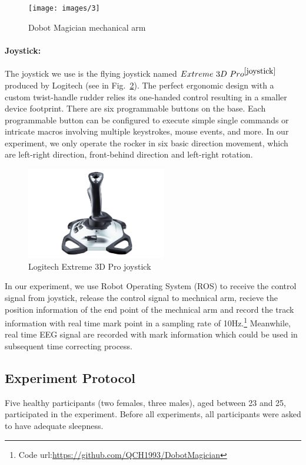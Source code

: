 \documentclass[runningheads,a4paper]{llncs}
\begin{document}
\begin{figure}
    \centering
    \texttt{[image: images/3]}
    \caption{Dobot Magician mechanical arm}
    \label{fig:dobot}
\end{figure}

\paragraph{Joystick:}
The joystick we use is the flying joystick named $Extreme\ 3D\ Pro^{\cite{joystick}}$
produced by Logitech (see in Fig.~\ref{fig:joystick}).
The perfect ergonomic design with a custom twist-handle rudder relies
its one-handed control resulting in a smaller device footprint.
There are six programmable buttons on the base.
Each programmable button can be configured to execute simple single commands or
intricate macros involving multiple keystrokes, mouse events, and more.
In our experiment, we only operate the rocker in six basic direction movement,
which are left-right direction, front-behind direction and left-right rotation.

\begin{figure}
    \centering
    \includegraphics[height=4cm]{images/4}
    \caption{Logitech Extreme 3D Pro joystick}
    \label{fig:joystick}
\end{figure}

In our experiment, we use Robot Operating System (ROS) to receive the control
signal from joystick, release the control signal to mechnical arm, recieve the
position information of the end point of the mechnical arm and record the track
information with real time mark point in a sampling rate of
10Hz.\footnote{Code url:\url{https://github.com/QCH1993/DobotMagician}} Meanwhile,
real time EEG signal are recorded with mark information which could be used in
subsequent time correcting process.

\subsection{Experiment Protocol}
Five healthy participants (two females, three males), aged between 23 and 25,
participated in the experiment. Before all experiments, all participants were
asked to have adequate sleepness.
\end{document}
